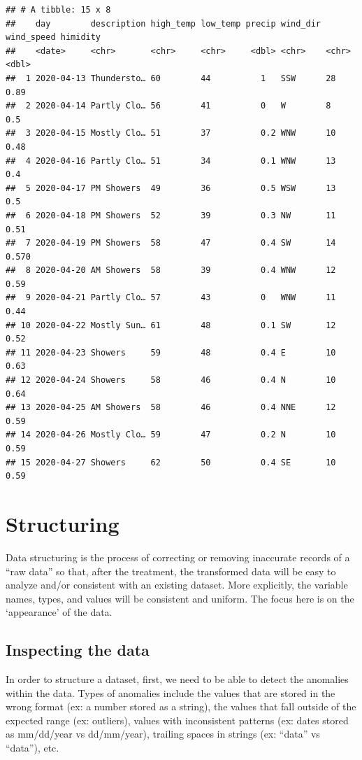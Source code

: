 \documentclass[
]{book}
\begin{document}
\begin{verbatim}
## # A tibble: 15 x 8
##    day        description high_temp low_temp precip wind_dir wind_speed himidity
##    <date>     <chr>       <chr>     <chr>     <dbl> <chr>    <chr>         <dbl>
##  1 2020-04-13 Thundersto… 60        44          1   SSW      28            0.89 
##  2 2020-04-14 Partly Clo… 56        41          0   W        8             0.5  
##  3 2020-04-15 Mostly Clo… 51        37          0.2 WNW      10            0.48 
##  4 2020-04-16 Partly Clo… 51        34          0.1 WNW      13            0.4  
##  5 2020-04-17 PM Showers  49        36          0.5 WSW      13            0.5  
##  6 2020-04-18 PM Showers  52        39          0.3 NW       11            0.51 
##  7 2020-04-19 PM Showers  58        47          0.4 SW       14            0.570
##  8 2020-04-20 AM Showers  58        39          0.4 WNW      12            0.59 
##  9 2020-04-21 Partly Clo… 57        43          0   WNW      11            0.44 
## 10 2020-04-22 Mostly Sun… 61        48          0.1 SW       12            0.52 
## 11 2020-04-23 Showers     59        48          0.4 E        10            0.63 
## 12 2020-04-24 Showers     58        46          0.4 N        10            0.64 
## 13 2020-04-25 AM Showers  58        46          0.4 NNE      12            0.59 
## 14 2020-04-26 Mostly Clo… 59        47          0.2 N        10            0.59 
## 15 2020-04-27 Showers     62        50          0.4 SE       10            0.59
\end{verbatim}

\hypertarget{structuring}{%
\chapter{Structuring}\label{structuring}}

Data structuring is the process of correcting or removing inaccurate records of a ``raw data'' so that, after the treatment, the transformed data will be easy to analyze and/or consistent with an existing dataset. More explicitly, the variable names, types, and values will be consistent and uniform. The focus here is on the `appearance' of the data.

\hypertarget{inspecting-the-data}{%
\section{Inspecting the data}\label{inspecting-the-data}}

In order to structure a dataset, first, we need to be able to detect the anomalies within the data. Types of anomalies include the values that are stored in the wrong format (ex: a number stored as a string), the values that fall outside of the expected range (ex: outliers), values with inconsistent patterns (ex: dates stored as mm/dd/year vs dd/mm/year), trailing spaces in strings (ex: ``data'' vs ``data''), etc.
\end{document}

